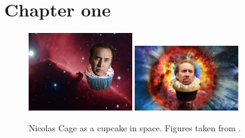 
\chapter{Chapter one}
\label{ch:one}


\lipsum[30-40]

\begin{figure}
  \centering
  \includegraphics[width=0.4\textwidth]{figures/cupcake1.jpg}
  \includegraphics[width=0.4\textwidth]{figures/cupcake2.jpg}
  \caption{Nicolas Cage as a cupcake in space. Figures taken from \citet{reference}.}
  \label{fig:nic_cake}
\end{figure}

\lipsum[41-3]
